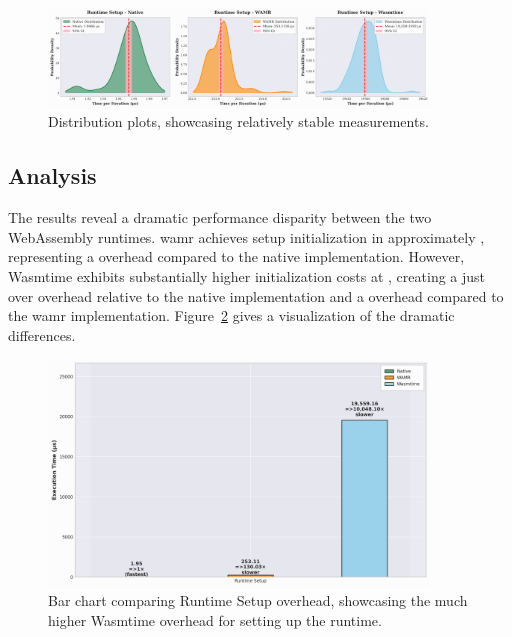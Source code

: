 \begin{figure}[h]
    \centering
    \includegraphics[width=0.9\textwidth]{images/setup-distribution}
    \caption{Distribution plots, showcasing relatively stable measurements.}
    \label{fig:wasm-setup-distribution}
\end{figure}

\subsection{Analysis}
The results reveal a dramatic performance disparity between the two WebAssembly runtimes. \acrshort{wamr} achieves setup initialization in approximately , representing a  overhead compared to the native implementation. However, Wasmtime exhibits substantially higher initialization costs at , creating a just over  overhead relative to the native implementation and a  overhead compared to the \acrshort{wamr} implementation. Figure~\ref{fig:wasm-setup-relative} gives a visualization of the dramatic differences.

\begin{figure}[h]
    \centering
    \includegraphics[width=0.9\textwidth]{images/setup_bars}
    \caption{Bar chart comparing Runtime Setup overhead, showcasing the much higher Wasmtime overhead for setting up the runtime.}
    \label{fig:wasm-setup-relative}
\end{figure}

